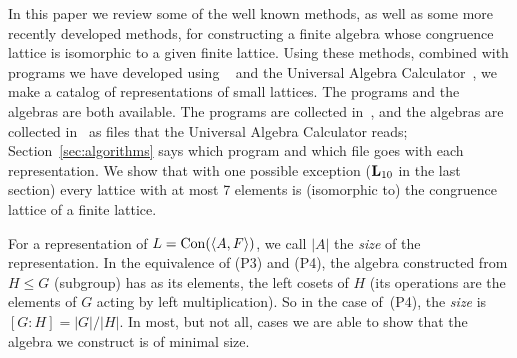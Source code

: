 In this paper we review some of the well known methods, as well as 
some more recently developed methods, for constructing a finite
algebra whose congruence lattice is isomorphic to a given finite
lattice. 
Using these methods, combined with programs we have developed using
\gap~\cite{GAP4} and the Universal Algebra Calculator~\cite{UACalc},
we make a catalog of representations of small
lattices.  The programs and the algebras are both available.  The
\gap programs are collected in~\cite{finlatrepgap}, and the algebras
are collected in~\cite{AlgebraFiles} as files that the Universal
Algebra Calculator reads; Section~\ref{sec:algorithms} says which
program and which file goes with each representation. We show that with one possible
exception ($\mathbf{L}_{10}$ in the last section) every 
lattice with at most 7 elements is (isomorphic to) the 
congruence lattice of a finite lattice. 

For a representation of $L = \operatorname{Con}(\langle A,F \rangle)$, we call
$|A|$ the \emph{size} of the representation. In the equivalence of
(P3) and (P4), the algebra constructed from $H \le G$ (subgroup) has
as its elements, the left cosets of $H$ (its operations are
the elements of $G$ acting by left multiplication). So in the case of~(P4),
the \emph{size} is $[G:H] = |G|/|H|$. 
In most, but not all,
cases we are able to show that the algebra we construct is 
of minimal size. 

